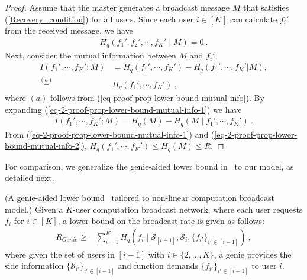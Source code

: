 \documentclass[conference, letterpaper]{IEEEtran} %
\begin{document}
\begin{proof}
Assume that the master generates a broadcast message $M$ that satisfies (\ref{Recovery_condition}) for all users. Since each user $i\in [K]$ can calculate $f_i'$ from the received message, we have
\begin{align}
\label{eq-proof-prop-lower-bound-mutual-info}
    H_q(f_1',f_2', \cdots, f_K'\mid M)=0 \ .
\end{align}
Next, consider the mutual information between $M$ and $f_i'$,
\begin{align}
\label{eq-2-proof-prop-lower-bound-mutual-info-1}
    I(f_1', \cdots, f_K'; M)&=H_q(f_1', \cdots, f_K')-H_q(f_1', \cdots, f_K'| M), \nonumber \\ 
    \overset{(a)}{=}&H_q(f_1', \cdots, f_K')\ ,
\end{align}
where $(a)$ follows from (\ref{eq-proof-prop-lower-bound-mutual-info}). By expanding (\ref{eq-2-proof-prop-lower-bound-mutual-info-1}) we have
\begin{align}
\label{eq-2-proof-prop-lower-bound-mutual-info-2}
    I(f_1', \cdots, f_K'; M)=H_q(M)-H_q(M\mid f_1', \cdots, f_K')\ .
\end{align}
From (\ref{eq-2-proof-prop-lower-bound-mutual-info-1}) and (\ref{eq-2-proof-prop-lower-bound-mutual-info-2}), $H_q(f_1', \cdots, f_K')\leq H_q(M)\leq R$.
\end{proof}




For comparison, we generalize the genie-aided lower bound in~\cite{jafar2006capacity} to our model, as detailed next.


\begin{prop}%
\label{prop-genie}  
(A genie-aided lower bound~\cite{jafar2006capacity} tailored to non-linear computation broadcast model.) 
Given a $K$-user computation broadcast network, where each user requests $f_i$ for $i \in [K]$, a lower bound on the broadcast rate is given as follows:
\begin{align}
\label{eq-geini-aided-rate}
R_{Genie}\geq&\sum_{i=1}^{K}H_q(f_i \mid \mathcal{S}_{[i-1]},\mathcal{S}_{i},\{f_{i'}\}_{i'\in[i-1]}) \ ,
\end{align}
where given the %
set of users in $[i-1]$ with $i\in\{2,\dots, K\}$, a genie provides the side information $\{\mathcal{S}_{i'}\}_{i'\in[i-1]}$ and function demands $\{f_{i'}\}_{i'\in[i-1]}$ to user $i$.  
\end{prop}
\end{document}
